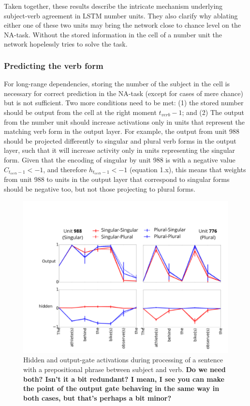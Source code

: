 Taken together, these results describe the intricate mechanism underlying subject-verb agreement in LSTM number units. 
They also clarify why ablating either one of these two units may bring the network close to chance level on the NA-task. 
Without the stored information in the cell of a number unit the network hopelessly tries to solve the task.



\subsubsection{Predicting the verb form}
For long-range dependencies, storing the number of the subject in the cell is necessary for correct prediction in the NA-task (except for cases of mere chance) but is not sufficient. 
Two more conditions need to be met: (1) the stored number should be output from the cell at the right moment $t_{verb}-1$; and (2) The output from the number unit should increase activations only in units that represent the matching verb form in the output layer. 
For example, the output from unit 988 should be projected differently to singular and plural verb forms in the output layer, such that it will increase activity only in units representing the singular form. 
Given that the encoding of singular by unit 988 is with a negative value $C_{t_{verb}-1}<-1$, and therefore $h_{t_{verb}-1}<-1$ (equation 1.x), this means that weights from unit 988 to units in the output layer that correspond to singular forms should be negative too, but not those projecting to plural forms.


\begin{figure}[ht]
\includegraphics[width=\textwidth]{Figures/Figure3_number_units_775_987_output_hidden.png}
\caption{Hidden and output-gate activations during processing of a sentence with a prepositional phrase between subject and verb. \textbf{Do we need both? Isn't it a bit redundant? I mean, I see you can make the point of the output gate behaving in the same way in both cases, but that's perhaps a bit minor?}}
\end{figure}

